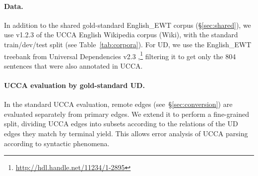 \documentclass[11pt,a4paper]{article}
\begin{document}
\paragraph{Data.}

In addition to the shared gold-standard English\_EWT corpus (\S\ref{sec:shared}),
we use v1.2.3 of the UCCA English Wikipedia corpus (Wiki),
with the standard train/dev/test split (see Table~\ref{tab:corpora}).
For UD,
we use the English\_EWT treebank from Universal Dependencies v2.3
\cite{11234/1-2895},\footnote{\url{http://hdl.handle.net/11234/1-2895}}
filtering it to get only the 804 sentences that were also annotated in UCCA.



%


\paragraph{UCCA evaluation by gold-standard UD.}

In the standard UCCA evaluation,
remote edges (see~\S\ref{sec:conversion}) are evaluated separately from primary edges.
We extend it to perform a fine-grained split,
dividing UCCA edges into subsets according to the relations of the UD edges
they match by terminal yield.
This allows error analysis of UCCA parsing according to syntactic phenomena.
\end{document}
